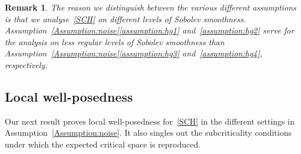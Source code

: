 \documentclass[reqno]{amsart}
\newtheorem{remark}[Satz]{Remark}
\newcommand{\1}{\mathbf{1}}
\begin{document}
    \begin{remark}
        The reason we distinguish between the various different assumptions is that we  analyse~\eqref{SCH} on different levels of Sobolev smoothness. Assumption~\ref{Assumption:noise}\ref{assumption:hg1} and~\ref{assumption:hg2} serve for the analysis on less regular levels of Sobolev smoothness than Assumption~\ref{Assumption:noise}\ref{assumption:hg3} and~\ref{assumption:hg4}, respectively. 
    \end{remark}
	\subsection{Local well-posedness}
    Our next result proves local well-posedness for~\eqref{SCH} in the different settings in Assumption~\ref{Assumption:noise}. It also singles out the subcriticality conditions under which the expected critical space is reproduced. 
\end{document}
